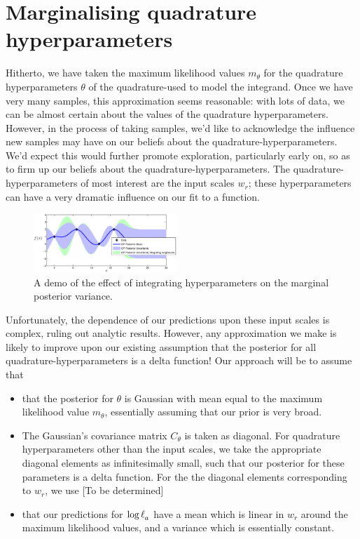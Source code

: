 \documentclass{article}
\begin{document}
\section{Marginalising quadrature hyperparameters}

Hitherto, we have taken the maximum likelihood values $m_\theta$ for the quadrature hyperparameters $\theta$ of the quadrature-\gpb used to model the integrand. Once we have very many samples, this approximation seems reasonable: with lots of data, we can be almost certain about the values of the quadrature hyperparameters. However, in the process of taking samples, we'd like to acknowledge the influence new samples may have on our beliefs about the quadrature-hyperparameters. We'd expect this would further promote exploration, particularly early on, so as to firm up our beliefs about the quadrature-hyperparameters. The quadrature-hyperparameters of most interest are the input scales $w_r$; these hyperparameters can have a very dramatic influence on our fit to a function.

\begin{figure}
\centering
\includegraphics[width=0.48\textwidth]{figures/integrate_lengthscales.eps}
\caption{A demo of the effect of integrating hyperparameters on the marginal posterior variance.}
\label{fig:integrate_hypers}
\end{figure}

Unfortunately, the dependence of our predictions upon these input scales is complex, ruling out analytic results. However, any approximation we make is likely to improve upon our existing assumption that the posterior for all quadrature-hyperparameters is a delta function! Our approach will be to assume that
\begin{itemize}
 \item that the posterior for $\theta$ is Gaussian with mean equal to the maximum likelihood value $m_\theta$, essentially assuming that our prior is very broad. 
\item The Gaussian's covariance matrix $C_\theta$ is taken as diagonal. For quadrature hyperparameters other than the input scales, we take the appropriate diagonal elements as infinitesimally small, such that our posterior for these parameters is a delta function. For the the diagonal elements corresponding to $w_r$, we use [To be determined]
\item that our predictions for $\tr_a$ have a mean which is linear in $w_r$ around the maximum likelihood values, and a variance which is essentially constant.  
\end{itemize}
 
\end{document}
